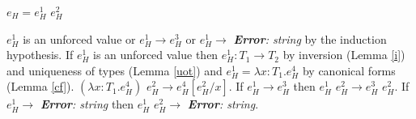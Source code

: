 \begin{case}

$e_{H}=e_{H}^{1}$ $e_{H}^{2}$

$e_{H}^{1}$ is an unforced value or $e_{H}^{1}\rightarrow e_{H}^{3}$ or $e_{H}^{1}\rightarrow$ \emph{\textbf{Error}: string} by the induction hypothesis.  If $e_{H}^{1}$ is an unforced value then $e_{H}^{1}:T_{1}\rightarrow T_{2}$ by inversion (Lemma \ref{i}) and uniqueness of types (Lemma \ref{uot}) and $e_{H}^{1}=\lambda x:T_{1}.e_{H}^{4}$ by canonical forms (Lemma \ref{cf}).  $(\lambda x:T_{1}.e_{H}^{4})$ $e_{H}^{2}\rightarrow e_{H}^{4}[e_{H}^{2}/x]$.  If $e_{H}^{1}\rightarrow e_{H}^{3}$ then $e_{H}^{1}$ $e_{H}^{2}\rightarrow e_{H}^{3}$ $e_{H}^{2}$.  If $e_{H}^{1}\rightarrow$ \emph{\textbf{Error}: string} then $e_{H}^{1}$ $e_{H}^{2}\rightarrow$ \emph{\textbf{Error}: string}.

\end{case}
